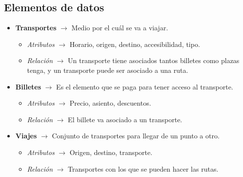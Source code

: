 \subsection{Elementos de datos}
\begin{itemize}
      \item \textbf{Transportes} $\rightarrow$ Medio por el cuál se va a viajar.
            \begin{itemize}
                  \item \textit{Atributos} $\rightarrow$ Horario, origen, destino, accesibilidad, tipo.
                  \item \textit{Relación} $\rightarrow$ Un transporte tiene asociados tantos billetes como plazas tenga, y un transporte puede ser asociado a una ruta.
            \end{itemize}
      \item \textbf{Billetes} $\rightarrow$ Es el elemento que se paga para tener acceso al transporte.
            \begin{itemize}
                  \item \textit{Atributos} $\rightarrow$ Precio, asiento, descuentos.
                  \item \textit{Relación} $\rightarrow$ El billete va asociado a un transporte.
            \end{itemize}
      \item \textbf{Viajes} $\rightarrow$ Conjunto de transportes para llegar de un punto a otro.
            \begin{itemize}
                  \item \textit{Atributos} $\rightarrow$ Origen, destino, transporte.
                  \item \textit{Relación} $\rightarrow$ Transportes con los que se pueden hacer las rutas.
            \end{itemize}
\end{itemize}

